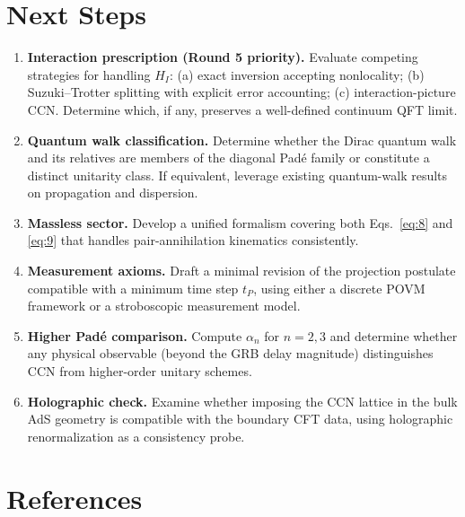 \documentclass[11pt,a4paper]{article}
\begin{document}
\section{Next Steps}

\begin{enumerate}
  \item \textbf{Interaction prescription (Round 5 priority).} Evaluate competing strategies for handling $H_I$: (a) exact inversion accepting nonlocality; (b) Suzuki--Trotter splitting with explicit error accounting; (c) interaction-picture CCN. Determine which, if any, preserves a well-defined continuum QFT limit.

  \item \textbf{Quantum walk classification.} Determine whether the Dirac quantum walk and its relatives are members of the diagonal Pad\'{e} family or constitute a distinct unitarity class. If equivalent, leverage existing quantum-walk results on propagation and dispersion.

  \item \textbf{Massless sector.} Develop a unified formalism covering both Eqs.~\eqref{eq:8} and \eqref{eq:9} that handles pair-annihilation kinematics consistently.

  \item \textbf{Measurement axioms.} Draft a minimal revision of the projection postulate compatible with a minimum time step $t_P$, using either a discrete POVM framework or a stroboscopic measurement model.

  \item \textbf{Higher Pad\'{e} comparison.} Compute $\alpha_n$ for $n = 2, 3$ and determine whether any physical observable (beyond the GRB delay magnitude) distinguishes CCN from higher-order unitary schemes.

  \item \textbf{Holographic check.} Examine whether imposing the CCN lattice in the bulk AdS geometry is compatible with the boundary CFT data, using holographic renormalization \cite{skenderis2002} as a consistency probe.
\end{enumerate}

\section*{References}
\end{document}
